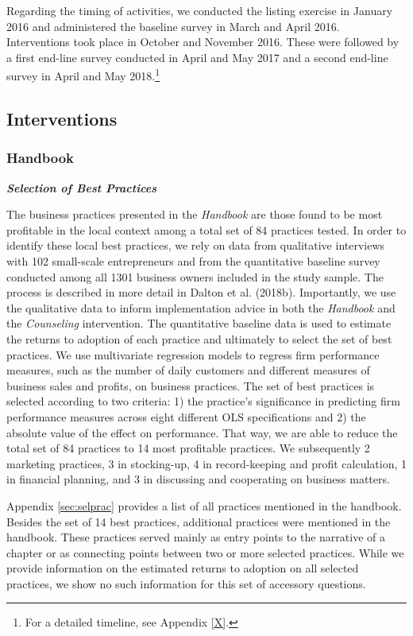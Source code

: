 \documentclass[11.5pt]{article}
\begin{document}
Regarding the timing of activities, we conducted the listing exercise in January 2016 and administered the baseline survey in March and April 2016. Interventions took place in October and November 2016. These were followed by a first end-line survey conducted in April and May 2017 and a second end-line survey in April and May 2018.\footnote{For a detailed timeline, see Appendix \ref{X}.}

\subsection{Interventions}

\subsubsection{Handbook}

\emph{\textbf{Selection of Best Practices}}\

The business practices presented in the \emph{Handbook} are those found to be most profitable in the local context among a total set of 84 practices tested. In order to identify these local best practices, we rely on data from qualitative interviews with 102 small-scale entrepreneurs and from the quantitative baseline survey conducted among all 1301 business owners included in the study sample. The process is described in more detail in Dalton et al. (2018b). Importantly, we use the qualitative data to inform implementation advice in both the \emph{Handbook} and the \emph{Counseling} intervention. The quantitative baseline data is used to estimate the returns to adoption of each practice and ultimately to select the set of best practices. We use multivariate regression models to regress firm performance measures, such as the number of daily customers and different measures of business sales and profits, on business practices. The set of best practices is selected according to two criteria: 1) the practice's significance in predicting firm performance measures across eight different OLS specifications and 2) the absolute value of the effect on performance. That way, we are able to reduce the total set of 84 practices to 14 most profitable practices. We subsequently 2 marketing practices, 3 in stocking-up, 4 in record-keeping and profit calculation, 1 in financial planning, and 3 in discussing and cooperating on business matters. 

Appendix \ref{sec:selprac} provides a list of all practices mentioned in the handbook. Besides the set of 14 best practices, additional practices were mentioned in the handbook. These practices served mainly as entry points to the narrative of a chapter or as connecting points between two or more selected practices. While we provide information on the estimated returns to adoption on all selected practices, we show no such information for this set of accessory questions. \\
\end{document}
